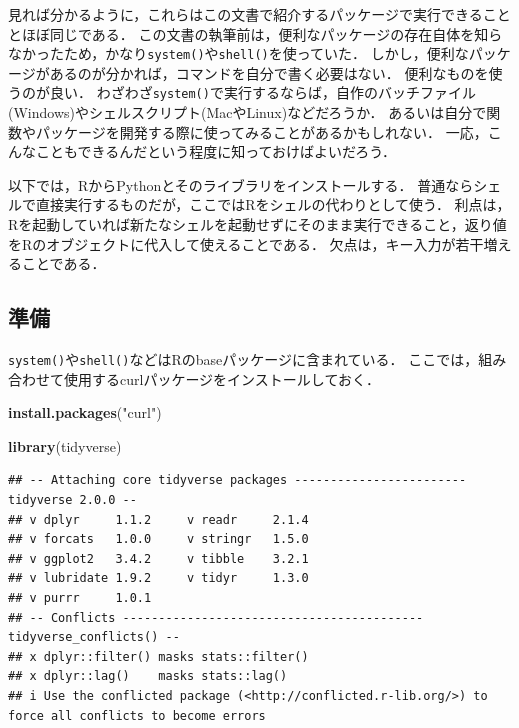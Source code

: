 \documentclass[
]{article}
\newenvironment{Shaded}{\begin{snugshade}}{\end{snugshade}}
\newcommand{\FunctionTok}[1]{\textcolor[rgb]{0.13,0.29,0.53}{\textbf{#1}}}
\newcommand{\NormalTok}[1]{#1}
\newcommand{\StringTok}[1]{\textcolor[rgb]{0.31,0.60,0.02}{#1}}
\begin{document}
見れば分かるように，これらはこの文書で紹介するパッケージで実行できることとほぼ同じである．
この文書の執筆前は，便利なパッケージの存在自体を知らなかったため，かなり\texttt{system()}や\texttt{shell()}を使っていた．
しかし，便利なパッケージがあるのが分かれば，コマンドを自分で書く必要はない．
便利なものを使うのが良い．
わざわざ\texttt{system()}で実行するならば，自作のバッチファイル(Windows)やシェルスクリプト(MacやLinux)などだろうか．
あるいは自分で関数やパッケージを開発する際に使ってみることがあるかもしれない．
一応，こんなこともできるんだという程度に知っておけばよいだろう．

以下では，RからPythonとそのライブラリをインストールする．
普通ならシェルで直接実行するものだが，ここではRをシェルの代わりとして使う．
利点は，Rを起動していれば新たなシェルを起動せずにそのまま実行できること，返り値をRのオブジェクトに代入して使えることである．
欠点は，キー入力が若干増えることである．

\hypertarget{ux6e96ux5099-5}{%
\subsection{準備}\label{ux6e96ux5099-5}}

\texttt{system()}や\texttt{shell()}などはRのbaseパッケージに含まれている．
ここでは，組み合わせて使用するcurlパッケージをインストールしておく．

\begin{Shaded}
\begin{Highlighting}[]
\FunctionTok{install.packages}\NormalTok{(}\StringTok{"curl"}\NormalTok{)}
\end{Highlighting}
\end{Shaded}

\begin{Shaded}
\begin{Highlighting}[]
\FunctionTok{library}\NormalTok{(tidyverse)}
\end{Highlighting}
\end{Shaded}

\begin{verbatim}
## -- Attaching core tidyverse packages ------------------------ tidyverse 2.0.0 --
## v dplyr     1.1.2     v readr     2.1.4
## v forcats   1.0.0     v stringr   1.5.0
## v ggplot2   3.4.2     v tibble    3.2.1
## v lubridate 1.9.2     v tidyr     1.3.0
## v purrr     1.0.1     
## -- Conflicts ------------------------------------------ tidyverse_conflicts() --
## x dplyr::filter() masks stats::filter()
## x dplyr::lag()    masks stats::lag()
## i Use the conflicted package (<http://conflicted.r-lib.org/>) to force all conflicts to become errors
\end{verbatim}
\end{document}
